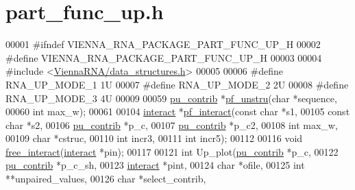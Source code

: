 \hypertarget{part__func__up_8h_source}{}\section{part\+\_\+func\+\_\+up.\+h}
\label{part__func__up_8h_source}

\begin{DoxyCode}
00001 \textcolor{preprocessor}{#ifndef VIENNA\_RNA\_PACKAGE\_PART\_FUNC\_UP\_H}
00002 \textcolor{preprocessor}{#define VIENNA\_RNA\_PACKAGE\_PART\_FUNC\_UP\_H}
00003 
00004 \textcolor{preprocessor}{#include <\hyperlink{data__structures_8h}{ViennaRNA/data\_structures.h}>}
00005 
00006 \textcolor{preprocessor}{#define   RNA\_UP\_MODE\_1   1U}
00007 \textcolor{preprocessor}{#define   RNA\_UP\_MODE\_2   2U}
00008 \textcolor{preprocessor}{#define   RNA\_UP\_MODE\_3   4U}
00009 
00059 \hyperlink{group__data__structures_structpu__contrib}{pu\_contrib} *\hyperlink{group__up__cofold_ga5b4ee40e190d2f633cd01cf0d2fe93cf}{pf\_unstru}(\textcolor{keywordtype}{char} *sequence,
00060                       \textcolor{keywordtype}{int} max\_w);
00061 
00104 \hyperlink{group__data__structures_structinteract}{interact} *\hyperlink{group__up__cofold_ga1aa0aa02bc3a724f87360c03097afd00}{pf\_interact}(\textcolor{keyword}{const} \textcolor{keywordtype}{char} *s1,
00105                       \textcolor{keyword}{const} \textcolor{keywordtype}{char} *s2,
00106                       \hyperlink{group__data__structures_structpu__contrib}{pu\_contrib} *p\_c,
00107                       \hyperlink{group__data__structures_structpu__contrib}{pu\_contrib} *p\_c2,
00108                       \textcolor{keywordtype}{int} max\_w,
00109                       \textcolor{keywordtype}{char} *cstruc,
00110                       \textcolor{keywordtype}{int} incr3,
00111                       \textcolor{keywordtype}{int} incr5);
00112 
00116 \textcolor{keywordtype}{void} \hyperlink{group__up__cofold_gadde308fd5f696dc271b1532aa96fd12f}{free\_interact}(\hyperlink{group__data__structures_structinteract}{interact} *pin);
00117 
00121 \textcolor{keywordtype}{int} Up\_plot(\hyperlink{group__data__structures_structpu__contrib}{pu\_contrib} *p\_c,
00122             \hyperlink{group__data__structures_structpu__contrib}{pu\_contrib} *p\_c\_sh,
00123             \hyperlink{group__data__structures_structinteract}{interact} *pint,
00124             \textcolor{keywordtype}{char} *ofile,
00125             \textcolor{keywordtype}{int} **unpaired\_values,
00126             \textcolor{keywordtype}{char} *select\_contrib,

\end{DoxyCode}

